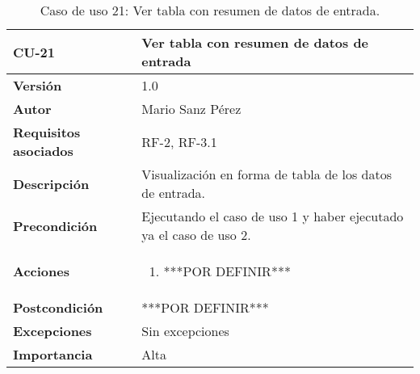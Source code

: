 \begin{table}[p]
	\centering
	\begin{tabularx}{\linewidth}{ p{} p{} }
		\toprule
		\textbf{CU-21}    & \textbf{Ver tabla con resumen de datos de entrada}\\
		\toprule
		\textbf{Versión}              & 1.0    \\
		\textbf{Autor}                & Mario Sanz Pérez \\
		\textbf{Requisitos asociados} & RF-2, RF-3.1 \\
		\textbf{Descripción}          & Visualización en forma de tabla de los datos de entrada. \\
		\textbf{Precondición}         & Ejecutando el caso de uso 1 y haber ejecutado ya el caso de uso 2. \\
		\textbf{Acciones}             &
		\begin{enumerate}
			\def\labelenumi{\arabic{enumi}.}
			\tightlist
			\item ***POR DEFINIR***
		\end{enumerate}\\
		\textbf{Postcondición}        & ***POR DEFINIR*** \\
		\textbf{Excepciones}          & Sin excepciones \\
		\textbf{Importancia}          & Alta \\
		\bottomrule
	\end{tabularx}
	\caption{Caso de uso 21: Ver tabla con resumen de datos de entrada.}
\end{table}

